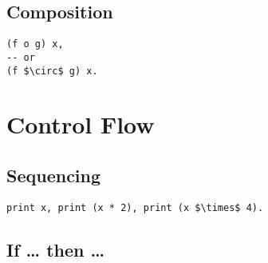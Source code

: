 \documentclass[a4paper,12pt]{article}
\newcommand{\code}{\lstinline}
\begin{document}
\subsection{Composition}
\begin{lstlisting}[mathescape=true]
(f o g) x,
-- or
(f $\circ$ g) x.
\end{lstlisting}


\section{Control Flow}
\subsection{Sequencing}
    \code[mathescape=true]|print x, print (x * 2), print (x $\times$ 4).|

\subsection{If \ldots{} then \ldots{}}






\newpage


\end{document}

